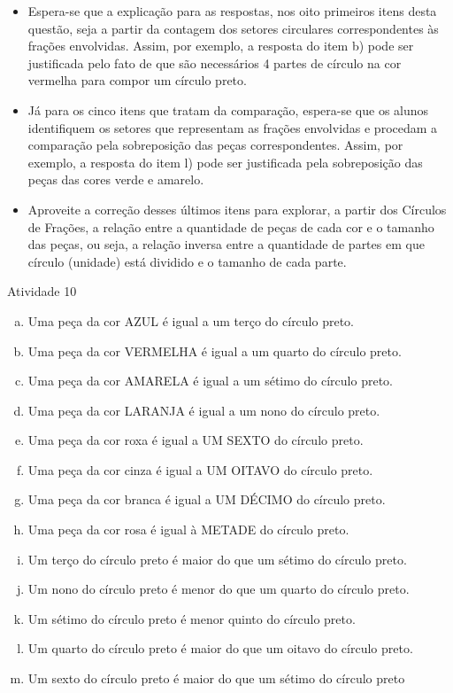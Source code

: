 \begin{multicols}{2}
\begin{itemize}
    \item Espera-se que a explicação para as respostas, nos oito primeiros itens desta questão, seja a partir da contagem dos setores circulares correspondentes às frações envolvidas. Assim, por exemplo, a resposta do item b) pode ser justificada pelo fato de que são necessários 4 partes de círculo na cor vermelha para compor um círculo preto.
    \item Já para os cinco itens que tratam da comparação, espera-se que os alunos identifiquem os setores que representam as frações envolvidas e procedam a comparação pela sobreposição das peças correspondentes. Assim, por exemplo, a resposta do item l) pode ser justificada pela sobreposição das peças das cores verde e amarelo.
    \item Aproveite a correção desses últimos itens para explorar, a partir dos Círculos de Frações, a relação entre a quantidade de peças de cada cor e o tamanho das peças, ou seja, a relação inversa entre a quantidade de partes em que círculo (unidade) está dividido e o tamanho de cada parte.
\end{itemize}

\end{multicols}


\begin{resposta*}{Atividade 10}
\begin{enumerate}[a)]
 \item Uma peça da cor AZUL é igual a um terço do círculo preto.
 \item    Uma peça da cor VERMELHA é igual a um quarto do círculo preto.
 \item    Uma peça da cor AMARELA é igual a um sétimo do círculo preto.
 \item    Uma peça da cor LARANJA é igual a um nono do círculo preto.
 \item    Uma peça da cor roxa é igual a UM SEXTO do círculo preto.
 \item    Uma peça da cor cinza é igual a UM OITAVO do círculo preto.
 \item    Uma peça da cor branca é igual a UM DÉCIMO do círculo preto.
 \item    Uma peça da cor rosa é igual à METADE do círculo preto.
 \item    Um terço do círculo preto é maior do que um sétimo do círculo preto.
 \item    Um nono do círculo preto é menor do que um quarto do círculo preto.
 \item    Um sétimo do círculo preto é menor quinto do círculo preto.
 \item    Um quarto do círculo preto é maior do que um oitavo do círculo preto.
 \item    Um sexto do círculo preto é maior do que um sétimo do círculo preto
\end{enumerate}

\end{resposta*}

